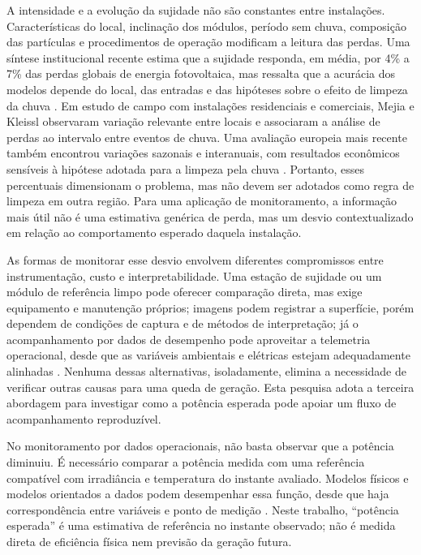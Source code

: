 \documentclass{UNESC}
\begin{document}
A intensidade e a evolução da sujidade não são constantes entre instalações. Características do local, inclinação dos módulos, período sem chuva, composição das partículas e procedimentos de operação modificam a leitura das perdas. Uma síntese institucional recente estima que a sujidade responda, em média, por 4\% a 7\% das perdas globais de energia fotovoltaica, mas ressalta que a acurácia dos modelos depende do local, das entradas e das hipóteses sobre o efeito de limpeza da chuva \cite{ieapvps2025soiling}. Em estudo de campo com instalações residenciais e comerciais, Mejia e Kleissl \cite{mejia2013} observaram variação relevante entre locais e associaram a análise de perdas ao intervalo entre eventos de chuva. Uma avaliação europeia mais recente também encontrou variações sazonais e interanuais, com resultados econômicos sensíveis à hipótese adotada para a limpeza pela chuva \cite{fernandezsolas2025}. Portanto, esses percentuais dimensionam o problema, mas não devem ser adotados como regra de limpeza em outra região. Para uma aplicação de monitoramento, a informação mais útil não é uma estimativa genérica de perda, mas um desvio contextualizado em relação ao comportamento esperado daquela instalação.

As formas de monitorar esse desvio envolvem diferentes compromissos entre instrumentação, custo e interpretabilidade. Uma estação de sujidade ou um módulo de referência limpo pode oferecer comparação direta, mas exige equipamento e manutenção próprios; imagens podem registrar a superfície, porém dependem de condições de captura e de métodos de interpretação; já o acompanhamento por dados de desempenho pode aproveitar a telemetria operacional, desde que as variáveis ambientais e elétricas estejam adequadamente alinhadas \cite{bessa2021}. Nenhuma dessas alternativas, isoladamente, elimina a necessidade de verificar outras causas para uma queda de geração. Esta pesquisa adota a terceira abordagem para investigar como a potência esperada pode apoiar um fluxo de acompanhamento reproduzível.

No monitoramento por dados operacionais, não basta observar que a potência diminuiu. É necessário comparar a potência medida com uma referência compatível com irradiância e temperatura do instante avaliado. Modelos físicos e modelos orientados a dados podem desempenhar essa função, desde que haja correspondência entre variáveis e ponto de medição \cite{dobos2014,li2024}. Neste trabalho, ``potência esperada'' é uma estimativa de referência no instante observado; não é medida direta de eficiência física nem previsão da geração futura.
\end{document}

